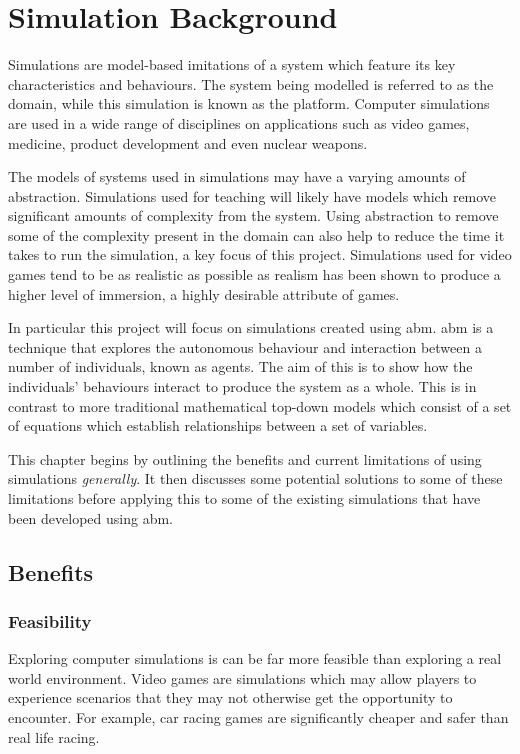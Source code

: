 \documentclass{UoYCSproject}
\begin{document}
\section{Simulation Background}
\label{simulation}
Simulations are model-based imitations of a system which feature its key characteristics and behaviours.
The system being modelled is referred to as the domain, while this simulation is known as the platform.
Computer simulations are used in a wide range of disciplines on applications such as video games, medicine, product development and even nuclear weapons.

The models of systems used in simulations may have a varying amounts of abstraction.
Simulations used for teaching will likely have models which remove significant amounts of complexity from the system.
Using abstraction to remove some of the complexity present in the domain can also help to reduce the time it takes to run the simulation, a key focus of this project.
Simulations used for video games tend to be as realistic as possible as realism has been shown to produce a higher level of immersion\cite{realism_immersion}, a highly desirable attribute of games.

In particular this project will focus on simulations created using \acrfull{abm}.
\gls{abm} is a technique that explores the autonomous behaviour and interaction between a number of individuals, known as agents.
The aim of this is to show how the individuals' behaviours interact to produce the system as a whole.
This is in contrast to more traditional mathematical top-down models which consist of a set of equations which establish relationships between a set of variables.

This chapter begins by outlining the benefits and current limitations of using simulations \textit{generally}.
It then discusses some potential solutions to some of these limitations before applying this to some of the existing simulations that have been developed using \gls{abm}.

\subsection{Benefits}
\subsubsection{Feasibility}
Exploring computer simulations is can be far more feasible than exploring a real world environment.
Video games are simulations which may allow players to experience scenarios that they may not otherwise get the opportunity to encounter.
For example, car racing games are significantly cheaper and safer than real life racing.
\end{document}
